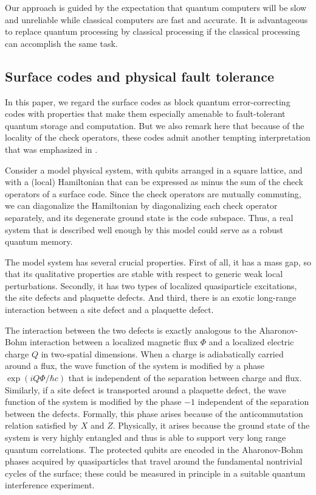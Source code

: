 Our approach is guided by the expectation that quantum computers will be slow and unreliable while classical computers are fast and accurate. It is advantageous to replace quantum processing by classical processing if the classical processing can accomplish the same task.

\subsection{Surface codes and physical fault tolerance}
In this paper, we regard the surface codes as block quantum error-correcting codes with properties that make them especially amenable to fault-tolerant quantum storage and computation. But we also remark here that because of the locality of the check operators, these codes admit another tempting interpretation that was emphasized in \cite{kitaev1,kitaev2}.

Consider a model physical system, with qubits arranged in a square lattice, and with a (local) Hamiltonian that can be expressed as minus the sum of the check operators of a surface code. Since the check operators are mutually commuting, we can diagonalize the Hamiltonian by diagonalizing each check operator separately, and its degenerate ground state is the code subspace. Thus, a real system that is described well enough by this model could serve as a robust quantum memory.  

The model system has several crucial properties. First of all, it has a mass gap, so that its qualitative properties are stable with respect to generic weak local perturbations. Secondly, it has two types of localized quasiparticle excitations, the site defects and plaquette defects. And third, there is an exotic long-range interaction between a site defect and a plaquette defect. 

The interaction between the two defects is exactly analogous to the Aharonov-Bohm interaction between a localized magnetic flux $\Phi$ and a localized electric charge $Q$ in two-spatial dimensions.  When a charge is adiabatically carried around a flux, the wave function of the system is modified by a phase $\exp(iQ\Phi/\hbar c)$ that is independent of the separation between charge and flux. Similarly, if a site defect is transported around a plaquette defect, the wave function of the system is modified by the phase $-1$ independent of the separation between the defects. Formally, this phase arises because of the anticommutation relation satisfied by $X$ and $Z$. Physically, it arises because the ground state of the system is very highly entangled and thus is able to support very long range quantum correlations. The protected qubits are encoded in the Aharonov-Bohm phases acquired by quasiparticles that travel around the fundamental nontrivial cycles of the surface; these could be measured in principle in a suitable quantum interference experiment.

